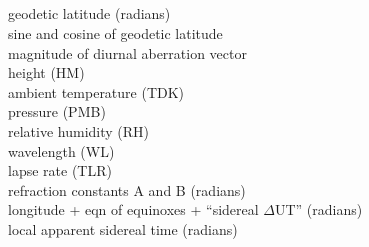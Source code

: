 {
  \\
  \\
  \\
  \\
      {geodetic latitude (radians)} \\
    {sine and cosine of geodetic latitude} \\
      {magnitude of diurnal aberration vector} \\
      {height (HM)} \\
      {ambient temperature (TDK)} \\
      {pressure (PMB)} \\
      {relative humidity (RH)} \\
      {wavelength (WL)} \\
     {lapse rate (TLR)} \\
  {refraction constants A and B (radians)} \\
     {longitude + eqn of equinoxes +
                       ``sidereal $\Delta$UT'' (radians)} \\
     {local apparent sidereal time (radians)}
}
{
}
\notes
